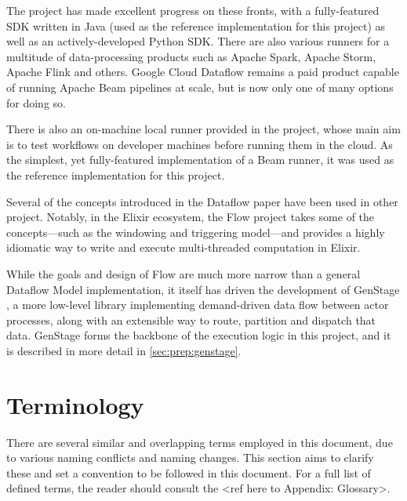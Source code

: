 The project has made excellent progress on these fronts, with a fully-featured SDK written in Java (used as the reference implementation for this project) as well as an actively-developed Python SDK.
There are also various runners for a multitude of data-processing products such as Apache Spark, Apache Storm, Apache Flink and others.
Google Cloud Dataflow remains a paid product capable of running Apache Beam pipelines at scale, but is now only one of many options for doing so.

There is also an on-machine local runner provided in the project, whose main aim is to test workflows on developer machines before running them in the cloud.
As the simplest, yet fully-featured implementation of a Beam runner, it was used as the reference implementation for this project.

Several of the concepts introduced in the Dataflow paper have been used in other project.
Notably, in the Elixir ecosystem, the Flow project \cite{ElixirFlow} takes some of the concepts---such as the windowing and triggering model---and provides a highly idiomatic way to write and execute multi-threaded computation in Elixir.

While the goals and design of Flow are much more narrow than a general Dataflow Model implementation, it itself has driven the development of GenStage \cite{ElixirGenStage}, a more low-level library implementing demand-driven data flow between actor processes, along with an extensible way to route, partition and dispatch that data.
GenStage forms the backbone of the execution logic in this project, and it is described in more detail in \cref{sec:prep:genstage}.

\section{Terminology}\label{sec:intro:terminology}

There are several similar and overlapping terms employed in this document, due to various naming conflicts and naming changes\footnotemark.
This section aims to clarify these and set a convention to be followed in this document.
For a full list of defined terms, the reader should consult the <ref here to Appendix: Glossary>.


